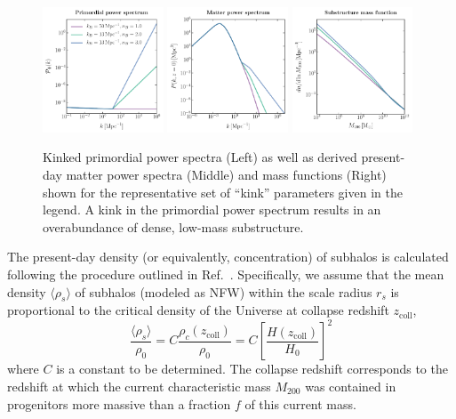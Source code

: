 \documentclass[twocolumn]{aastex63}
\begin{document}
\begin{figure}[]
  \centering
  \includegraphics[width=0.32\textwidth]{plots/primordial_kinked}
  \includegraphics[width=0.32\textwidth]{plots/matterpower_kinked}
  \includegraphics[width=0.32\textwidth]{plots/massfunction_kinked}
  \caption{Kinked primordial power spectra (Left) as well as derived present-day matter power spectra (Middle) and mass functions (Right) shown for the representative set of ``kink'' parameters given in the legend. A kink in the primordial power spectrum results in an overabundance of dense, low-mass substructure.}
  \label{fig:kinked_specs}
\end{figure}

The present-day density (or equivalently, concentration) of subhalos is calculated following the procedure outlined in Ref.~\cite{Ludlow:2016ifl}. Specifically, we assume that the mean density $\langle\rho_s\rangle$ of subhalos (modeled as NFW) within the scale radius $r_s$ is proportional to the critical density of the Universe at collapse redshift $z_\mathrm{coll}$,
\begin{equation}
\frac{\langle\rho_s\rangle}{\rho_0} = C\frac{\rho_c(z_\mathrm{coll})}{\rho_0} = C\left[\frac{H(z_\mathrm{coll})}{H_0}\right]^2
\label{eq:rho_s}
\end{equation}
where $C$ is a constant to be determined. The collapse redshift corresponds to the redshift at which the current characteristic mass $M_{200}$ was contained in progenitors more massive than a fraction $f$ of this current mass.
\end{document}

